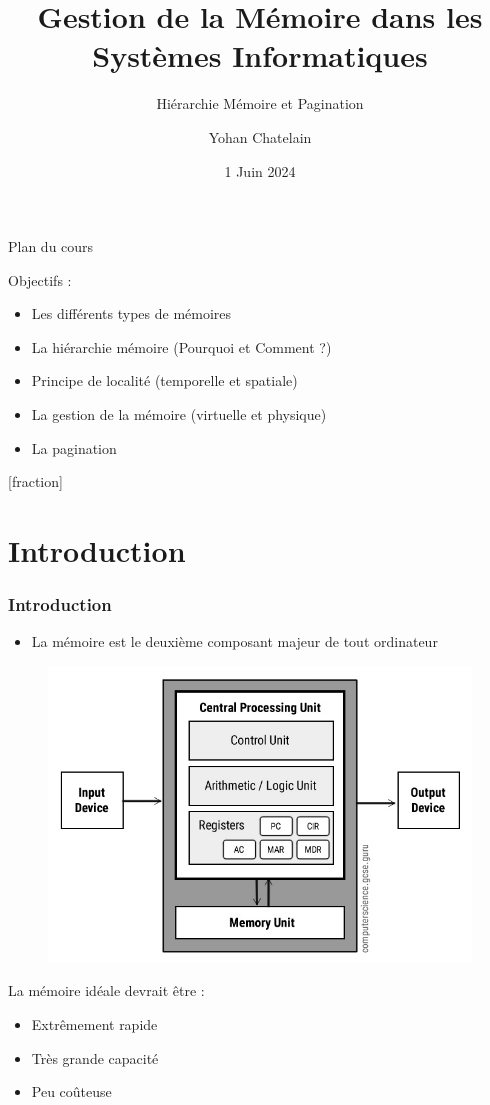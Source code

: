 \documentclass[8pt]{beamer}
\title{Gestion de la Mémoire dans les Systèmes Informatiques}
\subtitle{Hiérarchie Mémoire et Pagination}
\author{Yohan Chatelain}
\institute{Polytechnique Montr\'eal}
\date{1 Juin 2024}
\begin{document}
\begin{frame}
    \titlepage
\end{frame}

\begin{frame}{Plan du cours}
    \begin{block}{Objectifs : }

        \begin{itemize}
            \item Les différents types de mémoires
            \item La hiérarchie mémoire (Pourquoi et Comment ?)
            \item Principe de localité (temporelle et spatiale)
            \item La gestion de la mémoire (virtuelle et physique)
            \item La pagination
        \end{itemize}
    \end{block}
\end{frame}

\addtocounter{framenumber}{-2}
[fraction]

\section*{Introduction}
\begin{frame}
    \frametitle{Introduction}
    \begin{itemize}
        \item La mémoire est le deuxième composant majeur de tout ordinateur
    \end{itemize}
    \begin{figure}
        \centering

        \includegraphics[width=.45\textwidth]{figures/Von-Neumann-Architecture-Diagram.jpg}
        \label{fig:sub1}
    \end{figure}
    \begin{block}{La mémoire idéale devrait être :}
        \begin{itemize}
            \item Extrêmement rapide
            \item Très grande capacité
            \item Peu coûteuse
        \end{itemize}
    \end{block}

\end{frame}
\end{document}
